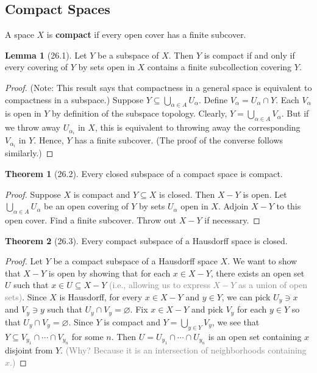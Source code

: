 \documentclass{article}
\newcommand{\com}[1]{\textcolor{grey}{#1}}
\theoremstyle{definition}
\newtheorem{theorem}{Theorem}[subsection]
\newtheorem{lemma}{Lemma}[subsection]
\begin{document}
\begin{flushleft}
\subsection{Compact Spaces}

A space $X$ is \textbf{compact} if every open cover has a finite subcover.

\begin{lemma}[26.1]
Let $Y$ be a subspace of $X$. Then $Y$ is compact if and only if every covering of $Y$ by sets open in $X$ contains a finite subcollection covering $Y$.
\end{lemma}

\begin{proof}
(Note: This result says that compactness in a general space is equivalent to compactness in a subspace.) Suppose $Y \subseteq \bigcup_{\alpha \in A} U_\alpha$. Define $V_\alpha = U_\alpha \cap Y$. Each $V_\alpha$ is open in $Y$ by definition of the subspace topology. Clearly, $Y = \bigcup_{\alpha \in A} V_{\alpha}$. But if we throw away $U_{\alpha_i}$ in $X$, this is equivalent to throwing away the corresponding $V_{\alpha_i}$ in $Y$. Hence, $Y$ has a finite subcover. (The proof of the converse follows similarly.)
\end{proof}

\begin{theorem}[26.2]
Every closed subspace of a compact space is compact.
\end{theorem}

\begin{proof}
Suppose $X$ is compact and $Y \subseteq X$ is closed. Then $X - Y$ is open. Let $\bigcup_{\alpha \in A} U_\alpha$ be an open covering of $Y$ by sets $U_\alpha$ open in $X$. Adjoin $X - Y$ to this open cover. Find a finite subcover. Throw out $X - Y$ if necessary.
\end{proof}

\begin{theorem}[26.3]
Every compact subspace of a Hausdorff space is closed.
\end{theorem}

\begin{proof}
Let $Y$ be a compact subspace of a Hausdorff space $X$. We want to show that $X - Y$ is open by showing that for each $x \in X - Y$, there exists an open set $U$ such that $x \in U \subseteq X - Y$ \com{(i.e., allowing us to express $X - Y$ as a union of open sets)}. Since $X$ is Hausdorff, for every $x \in X - Y$ and $y \in Y$, we can pick $U_y \ni x$ and $V_y \ni y$ such that $U_y \cap V_y = \varnothing$. Fix $x \in X - Y$ and pick $V_y$ for each $y \in Y$ so that $U_y \cap V_y = \varnothing$. Since $Y$ is compact and $Y = \bigcup_{y \in Y} V_y$, we see that $Y \subseteq V_{y_1} \cap \cdots \cap V_{y_n}$ for some $n$. Then $U = U_{y_1} \cap \cdots \cap U_{y_n}$ is an open set containing $x$ disjoint from $Y$. \com{(Why? Because it is an intersection of neighborhoods containing $x$.)}
\end{proof}


\end{flushleft}
\end{document}

